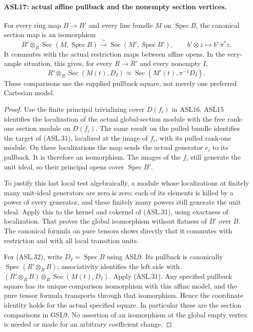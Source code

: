 \paragraph{ASL17: actual affine pullback and the nonempty section vertices.}
\label{claim:ASL17}
For every ring map $B\to B'$ and every line bundle $M$ on
$\operatorname{Spec}B$, the canonical section map is an isomorphism
\[
 B'\otimes_B\operatorname{Sec}(M,\operatorname{Spec}B)
       \xrightarrow{\ \sim\ }
       \operatorname{Sec}(M',\operatorname{Spec}B'),
 \qquad b'\otimes z\longmapsto b'\,\pi^*z.          \tag{ASL.31}
\]
It commutes with the actual restriction maps between affine
opens.  In the very-ample situation, this gives, for every
$R\to R'$ and every nonempty $I$,
\[
 R'\otimes_R\operatorname{Sec}(M(t),D_I)
       \simeq\operatorname{Sec}(M'(t),\pi^{-1}D_I).
                                                        \tag{ASL.32}
\]
These comparisons use the supplied pullback square, not merely
one preferred Cartesian model.

\begin{proof}
Use the finite principal trivializing cover $D(f_i)$ in ASL16.
ASL15 identifies the localization of the actual global-section
module with the free rank-one section module on $D(f_i)$.
The same result on the pulled bundle identifies the target of
(ASL.31), localized at the image of $f_i$, with its pulled
rank-one module.  On these localizations the map sends the
actual generator $e_i$ to its pullback.  It is therefore an
isomorphism.  The images of the $f_i$ still generate the unit
ideal, so their principal opens cover $\operatorname{Spec}B'$.

To justify this last local test algebraically, a module whose
localizations at finitely many unit-ideal generators are zero
is zero: each of its elements is killed by a power of every
generator, and these finitely many powers still generate the
unit ideal.  Apply this to the kernel and cokernel of (ASL.31),
using exactness of localization.  That proves the global
isomorphism without flatness of $B'$ over $B$.
The canonical formula on pure tensors shows directly that
it commutes with restriction and with all local transition units.

For (ASL.32), write $D_I=\operatorname{Spec}B$ using ASL9.
Its pullback is canonically
$\operatorname{Spec}(R'\otimes_RB)$; associativity identifies
the left side with
$(R'\otimes_RB)\otimes_B\operatorname{Sec}(M(t),D_I)$.
Apply (ASL.31).  Any specified pullback square has its unique
comparison isomorphism with this affine model, and the pure
tensor formula transports through that isomorphism.  Hence the
coordinate identity holds for the actual specified square.
In particular these are the section comparisons in GSL9.
No assertion of an isomorphism at the global empty vertex is
needed or made for an arbitrary coefficient change.
\end{proof}

